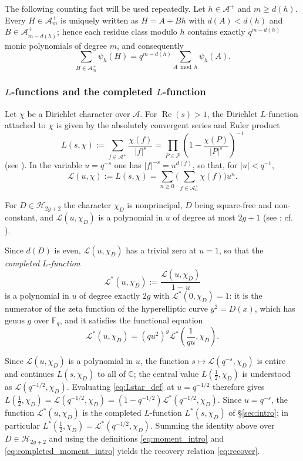 \documentclass[a4paper,reqno]{amsart}
\numberwithin{equation}{section}
\theoremstyle{remark}
\theoremstyle{definition}
\newcommand{\A}{\mathcal{A}}
\begin{document}
The following counting fact will be used repeatedly. Let $h\in\A^+$ and $m\ge d(h)$. Every $H\in\A_m^+$ is
uniquely written as $H=A+Bh$ with $d(A)<d(h)$ and $B\in\A_{m-d(h)}^+$;
hence each residue class modulo $h$ contains exactly $q^{m-d(h)}$ monic
polynomials of degree $m$, and consequently
\begin{equation}\label{eq:full-period}
\sum_{H\in\A_m^+}\psi_h(H)
=
q^{m-d(h)}\sum_{A\bmod h}\psi_h(A).
\end{equation}

\subsubsection*{$L$-functions and the completed $L$-function}
Let $\chi$ be a Dirichlet character over $\A$. For
$\operatorname{Re}(s)>1$, the Dirichlet $L$-function attached to $\chi$ is
given by the absolutely convergent series and Euler product
$$
L(s,\chi)
:=
\sum_{f\in\A^+}\frac{\chi(f)}{|f|^s}
=
\prod_{P\in\mathcal P}
\left(1-\frac{\chi(P)}{|P|^{s}}\right)^{-1}
$$
(see \cite[Chapter~4]{Ro02}). In the variable $u=q^{-s}$ one has
$|f|^{-s}=u^{d(f)}$, so that, for $|u|<q^{-1}$,
$$
\mathcal L(u,\chi)
:=
L(s,\chi)
=
\sum_{n\ge0}
\Biggl(
\sum_{f\in\A_n^+}\chi(f)
\Biggr)u^n.
$$

For $D\in\mathcal H_{2g+2}$ the character $\chi_D$ is nonprincipal, $D$
being square-free and non-constant, and $\mathcal L(u,\chi_D)$ is a
polynomial in $u$ of degree at most $2g+1$ (see
\cite[Proposition~4.3]{Ro02}; cf. \cite[Section~2]{Ju20}).

Since $d(D)$ is even, $\mathcal L(u,\chi_D)$ has a trivial zero at $u=1$, so
that the \emph{completed $L$-function}
\begin{equation}\label{eq:Lstar_def}
\mathcal L^*(u,\chi_D)
:=
\frac{\mathcal L(u,\chi_D)}{1-u}
\end{equation}
is a polynomial in $u$ of degree exactly $2g$ with
$\mathcal L^*(0,\chi_D)=1$: it is the numerator of the zeta function of the
hyperelliptic curve $y^2=D(x)$, which has genus $g$ over $\mathbb F_q$, and
it satisfies the functional equation
\begin{equation}\label{eq:FE_Lstar}
\mathcal L^*(u,\chi_D)
=
(qu^2)^g
\mathcal L^*\!\left(\frac{1}{qu},\chi_D\right).
\end{equation}

Since $\mathcal L(u,\chi_D)$ is a polynomial in $u$, the function
$s\mapsto\mathcal L(q^{-s},\chi_D)$ is entire and continues $L(s,\chi_D)$
to all of $\mathbb C$; the central value $L(\tfrac12,\chi_D)$ is understood
as $\mathcal L(q^{-1/2},\chi_D)$.
Evaluating \eqref{eq:Lstar_def} at $u=q^{-1/2}$ therefore gives
$L\!\left(\tfrac12,\chi_D\right) = \mathcal L(q^{-1/2},\chi_D) = (1-q^{-1/2}) \mathcal L^*(q^{-1/2},\chi_D)$.
Since $u=q^{-s}$, the function $\mathcal L^*(u,\chi_D)$ is the completed
$L$-function $L^*(s,\chi_D)$ of \S\ref{sec:intro}; in particular
$L^*\!\left(\tfrac12,\chi_D\right)=\mathcal L^*(q^{-1/2},\chi_D)$. Summing
the identity above over $D\in\mathcal H_{2g+2}$ and using the definitions
\eqref{eq:moment_intro} and \eqref{eq:completed_moment_intro} yields the
recovery relation \eqref{eq:recover}.
\end{document}

